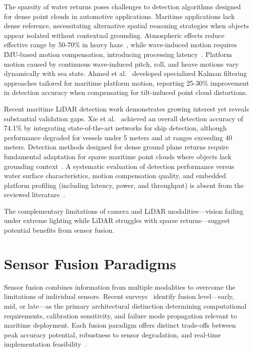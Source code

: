 \documentclass[../main.tex]{subfiles}
\begin{document}
The sparsity of water returns poses challenges to detection algorithms designed for dense point clouds in automotive applications.
Maritime applications lack dense reference, necessitating alternative spatial reasoning strategies when objects appear isolated without contextual grounding.
Atmospheric effects reduce effective range by 50-70\% in heavy haze~\cite{roriz2022}, while wave-induced motion requires IMU-based motion compensation, introducing processing latency~\cite{xie2024, ahmed2024}.
Platform motion caused by continuous wave-induced pitch, roll, and heave motions vary dynamically with sea state.
Ahmed et al.~\cite{ahmed2024} developed specialized Kalman filtering approaches tailored for maritime platform motion, reporting 25-30\% improvement in detection accuracy when compensating for tilt-induced point cloud distortions.

Recent maritime \ac{LiDAR} detection work demonstrates growing interest yet reveals substantial validation gaps.
Xie et al.~\cite{xie2024} achieved an overall detection accuracy of 74.1\% by integrating state-of-the-art networks for ship detection, although performance degraded for vessels under 5 meters and at ranges exceeding 40 meters.
Detection methods designed for dense ground plane returns require fundamental adaptation for sparse maritime point clouds where objects lack grounding context~\cite{kunz2005}.
A systematic evaluation of detection performance versus water surface characteristics, motion compensation quality, and embedded platform profiling (including latency, power, and throughput) is absent from the reviewed literature~\cite{xie2024, ahmed2024}.

The complementary limitations of camera and \ac{LiDAR} modalities---vision failing under extreme lighting while LiDAR struggles with sparse returns---suggest potential benefits from sensor fusion.

\section{Sensor Fusion Paradigms}

Sensor fusion combines information from multiple modalities to overcome the limitations of individual sensors.
Recent surveys~\cite{feng2021, tufekci2023, huang2024} identify fusion level---early, mid, or late---as the primary architectural distinction determining computational requirements, calibration sensitivity, and failure mode propagation relevant to maritime deployment.
Each fusion paradigm offers distinct trade-offs between peak accuracy potential, robustness to sensor degradation, and real-time implementation feasibility~\cite{feng2021}.
\end{document}
